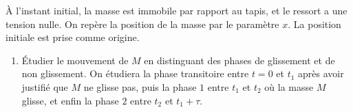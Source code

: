 \documentclass[a4paper,french,bookmarks]{article}
\begin{document}
     À l'instant initial, la masse est immobile par rapport au tapis, et le ressort a une tension nulle. On repère la position de la masse par le paramètre $x$. La position initiale est prise comme origine.
    
    \begin{enumerate}
        \item Étudier le mouvement de $M$ en distinguant des phases de glissement et de non glissement. On étudiera la phase transitoire entre $t = 0$ et $t_1$ après avoir justifié que $M$ ne glisse pas, puis la phase $1$ entre $t_1$ et $t_2$ où la masse $M$ glisse, et enfin la phase $2$ entre $t_2$ et $t_1 + \tau$.
        
        \noafter
\end{enumerate}
\end{document}
